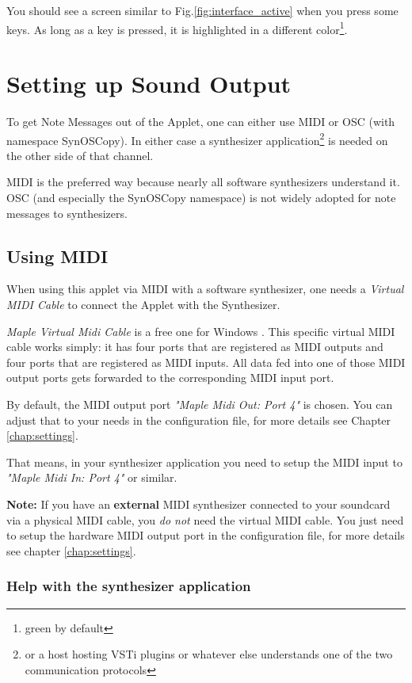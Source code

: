\documentclass[12pt,a4paper,titlepage,oneside]{report}
\begin{document}
You should see a screen similar to Fig.\ref{fig:interface_active} when you press some keys. As long as a key is pressed, it is highlighted in a different color\footnote{green by default}.


\section{Setting up Sound Output}
\label{sec:output}

To get Note Messages out of the Applet, one can either use MIDI or OSC (with namespace SynOSCopy). In either case a synthesizer application\footnote{or a host hosting VSTi plugins or whatever else understands one of the two communication protocols} is needed on the other side of that channel.

MIDI is the preferred way because nearly all software synthesizers understand it. OSC (and especially the SynOSCopy namespace) is not widely adopted for note messages to synthesizers.

\subsection{Using MIDI}

When using this applet via MIDI with a software synthesizer, one needs a \textit{Virtual MIDI Cable} to connect the Applet with the Synthesizer.

\textit{Maple Virtual Midi Cable} is a free one for Windows \cite{bib:maple}. This specific virtual MIDI cable works simply: it has four ports that are registered as MIDI outputs and four ports that are registered as MIDI inputs. All data fed into one of those MIDI output ports gets forwarded to the corresponding MIDI input port.

By default, the MIDI output port \textit{"Maple Midi Out: Port 4"} is chosen. You can adjust that to your needs in the configuration file, for more details see Chapter \ref{chap:settings}.

That means, in your synthesizer application you need to setup the MIDI input to \textit{"Maple Midi In: Port 4"} or similar.

\textbf{Note:} If you have an \textbf{external} MIDI synthesizer connected to your soundcard via a physical MIDI cable, you \emph{do not} need the virtual MIDI cable. You just need to setup the hardware MIDI output port in the configuration file, for more details see chapter \ref{chap:settings}.

\subsubsection{Help with the synthesizer application}
\end{document}
